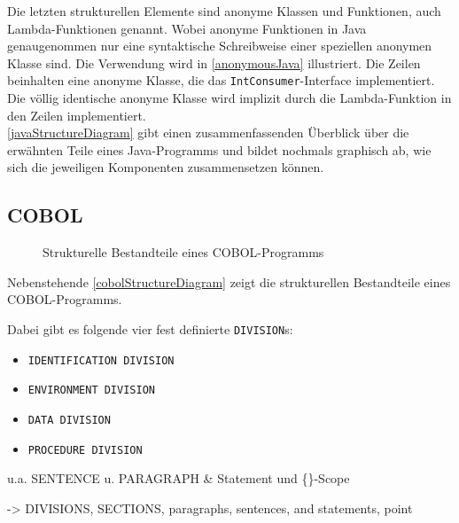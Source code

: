 
Die letzten strukturellen Elemente sind anonyme Klassen und Funktionen, auch Lambda-Funktionen genannt. Wobei anonyme Funktionen in Java genaugenommen nur eine syntaktische Schreibweise einer speziellen anonymen Klasse sind. Die Verwendung wird in \autoref{anonymousJava} illustriert. Die Zeilen  beinhalten eine anonyme Klasse, die das \texttt{IntConsumer}-Interface implementiert. Die völlig identische  anonyme Klasse wird implizit durch die Lambda-Funktion in den Zeilen  implementiert.\\

\autoref{javaStructureDiagram} gibt einen zusammenfassenden Überblick über die erwähnten Teile eines Java-Programms und bildet nochmals graphisch ab, wie sich die jeweiligen Komponenten zusammensetzen können.\\

\subsection*{COBOL}
{

\begin{wrapfigure}{l}{.5\textwidth}
\centering

\caption{Strukturelle Bestandteile eines COBOL-Programms\label{cobolStructureDiagram}}
\end{wrapfigure}
Nebenstehende \autoref{cobolStructureDiagram} zeigt die strukturellen Bestandteile eines COBOL-Programms. 

Dabei gibt es folgende vier fest definierte \texttt{DIVISION}s:
\begin{itemize}
    \item \texttt{IDENTIFICATION DIVISION}
    \item \texttt{ENVIRONMENT DIVISION}
    \item \texttt{DATA DIVISION}
    \item \texttt{PROCEDURE DIVISION}
\end{itemize}


u.a. SENTENCE u. PARAGRAPH \& Statement und \{\}-Scope

-> DIVISIONS, SECTIONS, paragraphs, sentences, and statements, point

}